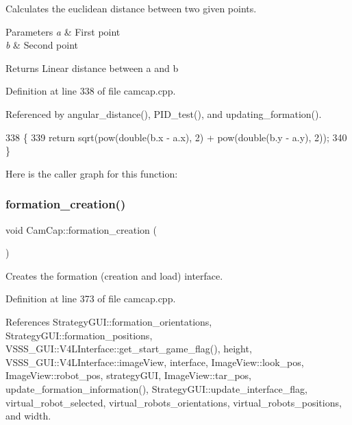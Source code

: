 Calculates the euclidean distance between two given points. 


\begin{DoxyParams}{Parameters}
{\em a} & First point \\
\hline
{\em b} & Second point \\
\hline
\end{DoxyParams}
\begin{DoxyReturn}{Returns}
Linear distance between a and b 
\end{DoxyReturn}


Definition at line 338 of file camcap.\+cpp.



Referenced by angular\+\_\+distance(), P\+I\+D\+\_\+test(), and updating\+\_\+formation().


\begin{DoxyCode}
338                                             \{
339     \textcolor{keywordflow}{return} sqrt(pow(\textcolor{keywordtype}{double}(b.x - a.x), 2) + pow(\textcolor{keywordtype}{double}(b.y - a.y), 2));
340 \}
\end{DoxyCode}
Here is the caller graph for this function\+:
\mbox{\label{class_cam_cap_a848749241df00e03c5fca82cc9423fdd}} 
\subsubsection{\texorpdfstring{formation\+\_\+creation()}{formation\_creation()}}
{\footnotesize\ttfamily void Cam\+Cap\+::formation\+\_\+creation (\begin{DoxyParamCaption}{ }\end{DoxyParamCaption})}



Creates the formation (creation and load) interface. 



Definition at line 373 of file camcap.\+cpp.



References Strategy\+G\+U\+I\+::formation\+\_\+orientations, Strategy\+G\+U\+I\+::formation\+\_\+positions, V\+S\+S\+S\+\_\+\+G\+U\+I\+::\+V4\+L\+Interface\+::get\+\_\+start\+\_\+game\+\_\+flag(), height, V\+S\+S\+S\+\_\+\+G\+U\+I\+::\+V4\+L\+Interface\+::image\+View, interface, Image\+View\+::look\+\_\+pos, Image\+View\+::robot\+\_\+pos, strategy\+G\+UI, Image\+View\+::tar\+\_\+pos, update\+\_\+formation\+\_\+information(), Strategy\+G\+U\+I\+::update\+\_\+interface\+\_\+flag, virtual\+\_\+robot\+\_\+selected, virtual\+\_\+robots\+\_\+orientations, virtual\+\_\+robots\+\_\+positions, and width.



